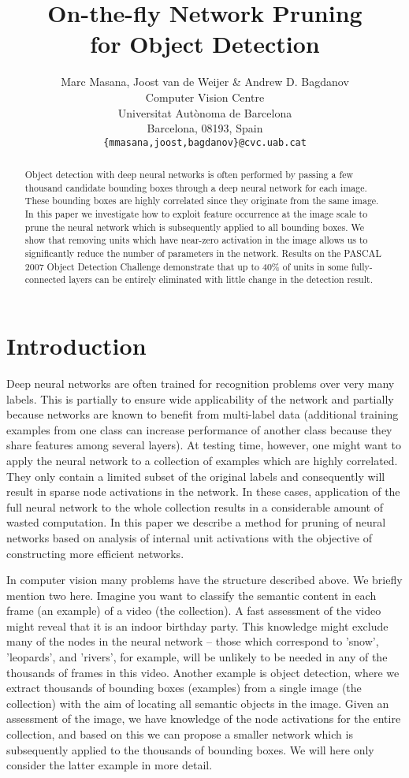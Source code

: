 \documentclass{article}
\title{On-the-fly Network Pruning\\ for Object Detection}
\author{Marc Masana, Joost van de Weijer \& Andrew D. Bagdanov \\
Computer Vision Centre\\
Universitat Aut\`{o}noma de Barcelona\\
Barcelona, 08193, Spain\\
\texttt{\{mmasana,joost,bagdanov\}@cvc.uab.cat}}
\begin{document}
\maketitle
\begin{abstract}
  Object detection with deep neural networks is often performed by
  passing a few thousand candidate bounding boxes through a deep
  neural network for each image. These bounding boxes are highly
  correlated since they originate from the same image. In this paper
  we investigate how to exploit feature occurrence at the image scale
  to prune the neural network which is subsequently applied to all
  bounding boxes. We show that removing units which have near-zero
  activation in the image allows us to significantly reduce the number
  of parameters in the network. Results on the PASCAL 2007 Object
  Detection Challenge demonstrate that up to 40\% of units in some
  fully-connected layers can be entirely eliminated with little change
  in the detection result.
\end{abstract}
\section{Introduction}
Deep neural networks are often trained for recognition problems over
very many labels. This is partially to ensure wide applicability of
the network and partially because networks are known to benefit
from multi-label data (additional training examples from one class can
increase performance of another class because they share features
among several layers). At testing time, however, one might want to
apply the neural network to a collection of examples which are
highly correlated. They only contain a limited subset of the
original labels and consequently will result in sparse node
activations in the network. In these cases, application of the full
neural network to the whole collection results in a considerable
amount of wasted computation. In this paper we describe a method for
pruning of neural networks based on analysis of internal unit
activations with the objective of constructing more efficient
networks.

In computer vision many problems have the structure described
above. We briefly mention two here. Imagine you want to classify the
semantic content in each frame (an example) of a video (the
collection). A fast assessment of the video might reveal that it is an
indoor birthday party. This knowledge might exclude many of the nodes
in the neural network -- those which correspond to 'snow', 'leopards',
and 'rivers', for example, will be unlikely to be needed in any of the
thousands of frames in this video. Another example is object
detection, where we extract thousands of bounding boxes (examples)
from a single image (the collection) with the aim of locating all
semantic objects in the image. Given an assessment of the image, we
have knowledge of the node activations for the entire collection, and
based on this we can propose a smaller network which is subsequently
applied to the thousands of bounding boxes. We will here only consider the latter
example in more detail.
\end{document}
